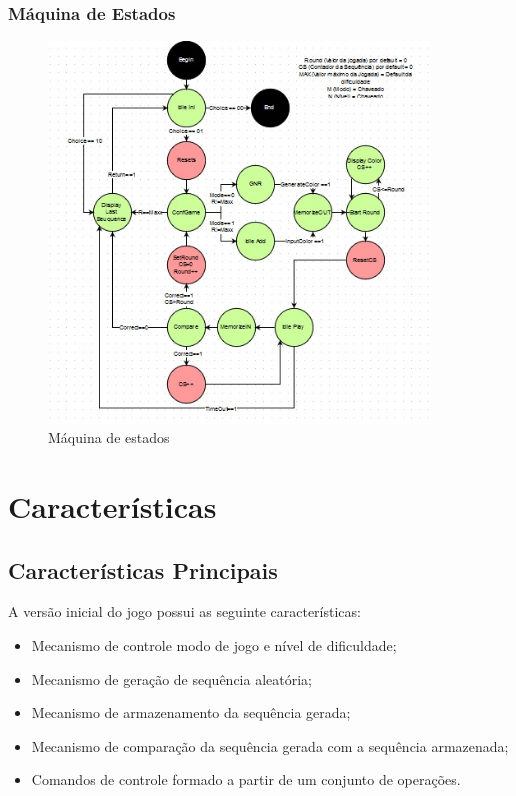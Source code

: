 \documentclass{report}
\begin{document}
    \subsection{Máquina de Estados}
    \begin{figure}[H] \centering \includegraphics[width=0.9\textwidth]{Figura2.jpg}                \caption{Máquina de estados} \label{fig:mesh1} 
    \end{figure}
     
    
\chapter{Características}
    \section{Características Principais}
    A versão inicial do jogo possui as seguinte características:
     \begin{itemize}
        \item Mecanismo de controle modo de jogo e nível de dificuldade;
        \item Mecanismo de geração de sequência aleatória;
        \item Mecanismo de armazenamento da sequência gerada;
        \item Mecanismo de comparação da sequência gerada com a sequência armazenada;
        \item Comandos de controle formado a partir de um conjunto de operações.
      \end{itemize}
    
\end{document}
